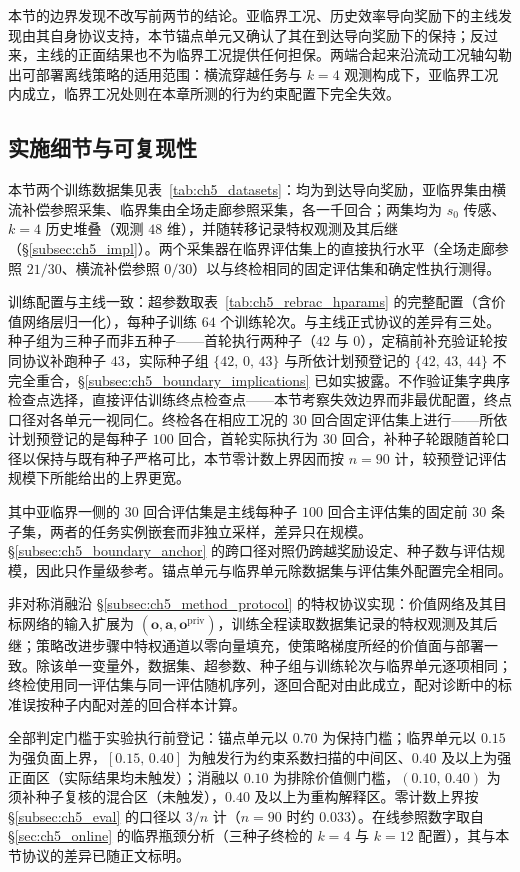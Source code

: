本节的边界发现不改写前两节的结论。亚临界工况、历史效率导向奖励下的主线发现由其自身协议支持，本节锚点单元又确认了其在到达导向奖励下的保持；反过来，主线的正面结果也不为临界工况提供任何担保。两端合起来沿流动工况轴勾勒出可部署离线策略的适用范围：横流穿越任务与 $k=4$ 观测构成下，亚临界工况内成立，临界工况处则在本章所测的行为约束配置下完全失效。

\subsection{实施细节与可复现性}\label{subsec:ch5_boundary_impl}

本节两个训练数据集见表~\ref{tab:ch5_datasets}：均为到达导向奖励，亚临界集由横流补偿参照采集、临界集由全场走廊参照采集，各一千回合；两集均为 $s_0$ 传感、$k=4$ 历史堆叠（观测 $48$ 维），并随转移记录特权观测及其后继（\S\ref{subsec:ch5_impl}）。两个采集器在临界评估集上的直接执行水平（全场走廊参照 $21/30$、横流补偿参照 $0/30$）以与终检相同的固定评估集和确定性执行测得。

训练配置与主线一致：超参数取表~\ref{tab:ch5_rebrac_hparams} 的完整配置（含价值网络层归一化），每种子训练 $64$ 个训练轮次。与主线正式协议的差异有三处。种子组为三种子而非五种子——首轮执行两种子（$42$ 与 $0$），定稿前补充验证轮按同协议补跑种子 $43$，实际种子组 $\{42,\,0,\,43\}$ 与所依计划预登记的 $\{42,\,43,\,44\}$ 不完全重合，\S\ref{subsec:ch5_boundary_implications} 已如实披露。不作验证集字典序检查点选择，直接评估训练终点检查点——本节考察失效边界而非最优配置，终点口径对各单元一视同仁。终检各在相应工况的 $30$ 回合固定评估集上进行——所依计划预登记的是每种子 $100$ 回合，首轮实际执行为 $30$ 回合，补种子轮跟随首轮口径以保持与既有种子严格可比，本节零计数上界因而按 $n=90$ 计，较预登记评估规模下所能给出的上界更宽。

其中亚临界一侧的 $30$ 回合评估集是主线每种子 $100$ 回合主评估集的固定前 $30$ 条子集，两者的任务实例嵌套而非独立采样，差异只在规模。\S\ref{subsec:ch5_boundary_anchor} 的跨口径对照仍跨越奖励设定、种子数与评估规模，因此只作量级参考。锚点单元与临界单元除数据集与评估集外配置完全相同。

非对称消融沿 \S\ref{subsec:ch5_method_protocol} 的特权协议实现：价值网络及其目标网络的输入扩展为 $(\mathbf{o},\mathbf{a},\mathbf{o}^{\mathrm{priv}})$，训练全程读取数据集记录的特权观测及其后继；策略改进步骤中特权通道以零向量填充，使策略梯度所经的价值面与部署一致。除该单一变量外，数据集、超参数、种子组与训练轮次与临界单元逐项相同；终检使用同一评估集与同一评估随机序列，逐回合配对由此成立，配对诊断中的标准误按种子内配对差的回合样本计算。

全部判定门槛于实验执行前登记：锚点单元以 $0.70$ 为保持门槛；临界单元以 $0.15$ 为强负面上界，$[0.15,\,0.40]$ 为触发行为约束系数扫描的中间区、$0.40$ 及以上为强正面区（实际结果均未触发）；消融以 $0.10$ 为排除价值侧门槛，$(0.10,\,0.40)$ 为须补种子复核的混合区（未触发），$0.40$ 及以上为重构解释区。零计数上界按 \S\ref{subsec:ch5_eval} 的口径以 $3/n$ 计（$n=90$ 时约 $0.033$）。在线参照数字取自 \S\ref{sec:ch5_online} 的临界瓶颈分析（三种子终检的 $k=4$ 与 $k=12$ 配置），其与本节协议的差异已随正文标明。
